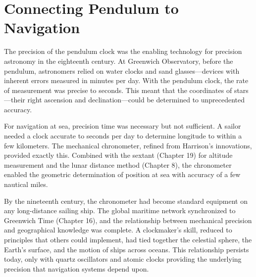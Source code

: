 \section{Connecting Pendulum to Navigation}

The precision of the pendulum clock was the enabling technology for precision astronomy in the eighteenth century. At Greenwich Observatory, before the pendulum, astronomers relied on water clocks and sand glasses—devices with inherent errors measured in minutes per day. With the pendulum clock, the rate of measurement was precise to seconds. This meant that the coordinates of stars—their right ascension and declination—could be determined to unprecedented accuracy.

For navigation at sea, precision time was necessary but not sufficient. A sailor needed a clock accurate to seconds per day to determine longitude to within a few kilometers. The mechanical chronometer, refined from Harrison's innovations, provided exactly this. Combined with the sextant (Chapter 19) for altitude measurement and the lunar distance method (Chapter 8), the chronometer enabled the geometric determination of position at sea with accuracy of a few nautical miles.

By the nineteenth century, the chronometer had become standard equipment on any long-distance sailing ship. The global maritime network synchronized to Greenwich Time (Chapter 16), and the relationship between mechanical precision and geographical knowledge was complete. A clockmaker's skill, reduced to principles that others could implement, had tied together the celestial sphere, the Earth's surface, and the motion of ships across oceans. This relationship persists today, only with quartz oscillators and atomic clocks providing the underlying precision that navigation systems depend upon.
